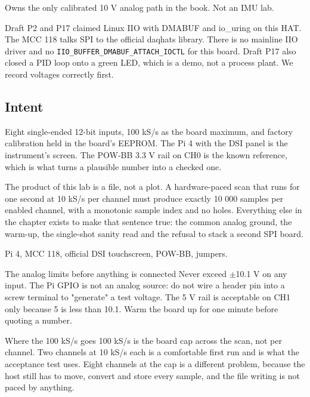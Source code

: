 
\begin{unique}
Owns the only calibrated 10 V analog path in the book. Not an IMU lab.
\end{unique}

\begin{blueprint}
Draft P2 and P17 claimed Linux IIO with DMABUF and io\_uring on this HAT. The MCC 118 talks SPI to the official daqhats library. There is no mainline IIO driver and no \texttt{IIO\_BUFFER\_DMABUF\_ATTACH\_IOCTL} for this board. Draft P17 also closed a PID loop onto a green LED, which is a demo, not a process plant. We record voltages correctly first.
\end{blueprint}

\subsection*{Intent}

Eight single-ended 12-bit inputs, 100 kS/s as the board maximum, and factory calibration held in the board's EEPROM. The Pi 4 with the DSI panel is the instrument's screen. The POW-BB 3.3 V rail on CH0 is the known reference, which is what turns a plausible number into a checked one.

The product of this lab is a file, not a plot. A hardware-paced scan that runs for one second at 10 kS/s per channel must produce exactly 10 000 samples per enabled channel, with a monotonic sample index and no holes. Everything else in the chapter exists to make that sentence true: the common analog ground, the warm-up, the single-shot sanity read and the refusal to stack a second SPI board.

\begin{kit}
Pi 4, MCC 118, official DSI touchscreen, POW-BB, jumpers.
\end{kit}

\begin{rulebox}{The analog limits before anything is connected}
Never exceed $\pm$10.1 V on any input. The Pi GPIO is not an analog source: do not wire a header pin into a screw terminal to "generate" a test voltage. The 5 V rail is acceptable on CH1 only because 5 is less than 10.1. Warm the board up for one minute before quoting a number.
\end{rulebox}

\begin{note}{Where the 100 kS/s goes}
100 kS/s is the board cap across the scan, not per channel. Two channels at 10 kS/s each is a comfortable first run and is what the acceptance test uses. Eight channels at the cap is a different problem, because the host still has to move, convert and store every sample, and the file writing is not paced by anything.
\end{note}

